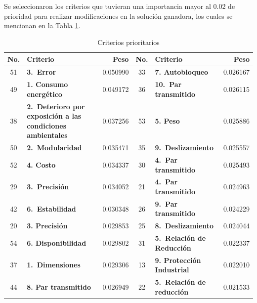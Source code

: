 Se seleccionaron los criterios que tuvieran una importancia mayor al 0.02 de prioridad para realizar modificaciones en la solución ganadora, los cuales se mencionan en la Tabla \ref{tab:ganadores}.

\begin{table}[H]
	\centering
	\caption{Criterios prioritarios}
	\begin{tabular}{|c|p{10em}|r||c|p{10em}|r|}
		\hline
		\multicolumn{1}{|p{1.855em}|}{\textbf{No.}} & \textbf{Criterio} & \multicolumn{1}{p{4.43em}||}{\textbf{Peso}} & \multicolumn{1}{p{1.855em}|}{\textbf{No.}} & \textbf{Criterio} & \multicolumn{1}{p{4.43em}|}{\textbf{Peso}} \\
		\hline
		51    & \multicolumn{1}{l|}{\textbf{3. Error}} & 0.050990 & 33    & \cellcolor[rgb]{ .573,  .816,  .314}\textbf{7. Autobloqueo} & 0.026167 \\
		\hline
		49    & \multicolumn{1}{l|}{\textbf{1. Consumo energético}} & 0.049172 & 36    & \cellcolor[rgb]{ .573,  .816,  .314}\textbf{10. Par transmitido} & 0.026115 \\
		\hline
		38    & \cellcolor[rgb]{ .439,  .188,  .627}\textbf{2. Deterioro por exposición a las condiciones ambientales} & 0.037256 & 53    & \multicolumn{1}{l|}{\textbf{5. Peso}} & 0.025886 \\
		\hline
		50    & \multicolumn{1}{l|}{\textbf{2. Modularidad}} & 0.035471 & 35    & \cellcolor[rgb]{ .573,  .816,  .314}\textbf{9. Deslizamiento} & 0.025557 \\
		\hline
		52    & \multicolumn{1}{l|}{\textbf{4. Costo}} & 0.034337 & 30    & \cellcolor[rgb]{ .573,  .816,  .314}\textbf{4. Par transmitido} & 0.025493 \\
		\hline
		29    & \cellcolor[rgb]{ .573,  .816,  .314}\textbf{3. Precisión} & 0.034052 & 21    & \cellcolor[rgb]{ 0,  .69,  .314}\textbf{4. Par transmitido} & 0.024963 \\
		\hline
		42    & \cellcolor[rgb]{ .439,  .188,  .627}\textbf{6. Estabilidad} & 0.030348 & 26    & \cellcolor[rgb]{ 0,  .69,  .314}\textbf{9. Par transmitido} & 0.024229 \\
		\hline
		20    & \cellcolor[rgb]{ 0,  .69,  .314}\textbf{3. Precisión} & 0.029853 & 25    & \cellcolor[rgb]{ 0,  .69,  .314}\textbf{8. Deslizamiento} & 0.024044 \\
		\hline
		54    & \textbf{6. Disponibilidad} & 0.029802 & 31    & \cellcolor[rgb]{ .573,  .816,  .314}\textbf{5. Relación de Reducción} & 0.022337 \\
		\hline
		37    & \cellcolor[rgb]{ .439,  .188,  .627}\textbf{1. Dimensiones} & 0.029306 & 13    & \cellcolor[rgb]{ 1,  0,  0}\textbf{9. Protección Industrial} & 0.022010 \\
		\hline
		44    & \cellcolor[rgb]{ .439,  .188,  .627}\textbf{8. Par transmitido} & 0.026949 & 22    & \cellcolor[rgb]{ 0,  .69,  .314}\textbf{5. Relación de reducción} & 0.021533 \\
		\hline
	\end{tabular}%
	\label{tab:ganadores}%
\end{table}%

